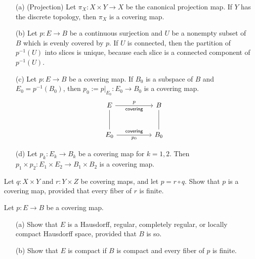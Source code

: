 \begin{exmp}
    \begin{enumerate}
        \item[(a)]
        {
            (Projection)
            Let $\pi_X: X\times Y\rightarrow X$ be the canonical projection map.
            If $Y$ has the discrete topology, then $\pi_X$ is a covering map.
        }
        \item[(b)]
        {
            Let $p: E\rightarrow B$ be a continuous surjection and $U$ be a nonempty subset of $B$ which is evenly covered by $p$.
            If $U$ is connected, then the partition of $p^{-1}(U)$ into slices is unique, because each slice is a connected component of $p^{-1}(U)$.
        }
        \item[(c)]
        {
            Let $p: E\rightarrow B$ be a covering map.
            If $B_0$ is a subspace of $B$ and $E_0=p^{-1}(B_0)$, then $p_0:=p|_{E_0}: E_0\rightarrow B_0$ is a covering map.
            \begin{equation*}
            \begin{tikzcd}[row sep=1.0cm, column sep=1.8cm]
                E\arrow[r, "p", "\textsf{covering}"']
                \arrow[d, dash]
                &
                B
                \arrow[d, dash]
                \\
                E_0\arrow[r, "p_0"', "\textsf{covering}"]
                &
                B_0
            \end{tikzcd}
            \end{equation*}
        }
        \item[(d)]
        {
            Let $p_k: E_k\rightarrow B_k$ be a covering map for $k=1, 2$.
            Then $p_1\times p_2: E_1\times E_2\rightarrow B_1\times B_2$ is a covering map.
        }
    \end{enumerate}
\end{exmp}

\color{red}
\begin{prob}
    Let $q: X\times Y$ and $r: Y\times Z$ be covering maps, and let $p=r\circ q$.
    Show that $p$ is a covering map, provided that every fiber of $r$ is finite.
\end{prob}
\begin{sol}
    
\end{sol}

\begin{prob}
    Let $p: E\rightarrow B$ be a covering map.
    \begin{enumerate}
        \item[(a)]
        {
            Show that $E$ is a Hausdorff, regular, completely regular, or locally compact Hausdorff space, provided that $B$ is so.
        }
        \item[(b)]
        {
            Show that $E$ is compact if $B$ is compact and every fiber of $p$ is finite.
        }
    \end{enumerate}
\end{prob}
\begin{sol}
    
\end{sol}
\color{black}